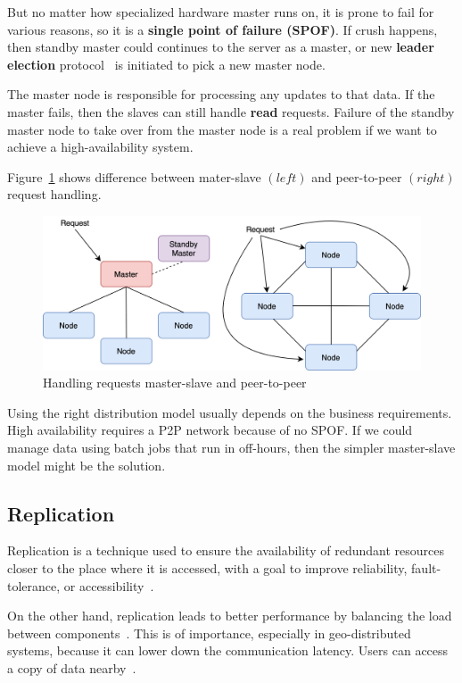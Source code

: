 But no matter how specialized hardware master runs on, it is prone to fail for various reasons, so it is a \textbf{single point of failure (SPOF)}. If crush happens, then standby master could continues to the server as a master, or new \textbf{leader election} protocol~\cite{KorachKM90} is initiated to pick a new master node. 

The master node is responsible for processing any updates to that data. If the master fails, then the slaves can still handle \textbf{read} requests. Failure of the standby master node to take over from the master node is a real problem if we want to achieve a high-availability system.

Figure~\ref{fig:fig16} shows difference between mater-slave $(left)$ and peer-to-peer $(right)$ request handling.

\begin{figure}[H]
	\begin{center}
		\includegraphics[scale=0.6]{images/Figure16}
	\end{center}
	\vspace{-0.6cm}
	\caption{Handling requests master-slave and peer-to-peer}
	\label{fig:fig16}
\end{figure}

\noindent
Using the right distribution model usually depends on the business requirements. High availability requires a P2P network because of no SPOF. If we could manage data using batch jobs that run in off-hours, then the simpler master-slave model might be the solution.
%
%
\subsection{Replication}\label{sec:replication_protocol}
%
Replication is a technique used to ensure the availability of redundant resources closer to the place where it is accessed, with a goal to improve reliability, fault-tolerance, or accessibility~\cite{SteenT16, 0019513}.

On the other hand, replication leads to better performance by balancing the load between components~\cite{SteenT16}. This is of importance, especially in geo-distributed systems, because it can lower down the communication latency. Users can access a copy of data nearby~\cite{0019513}.

